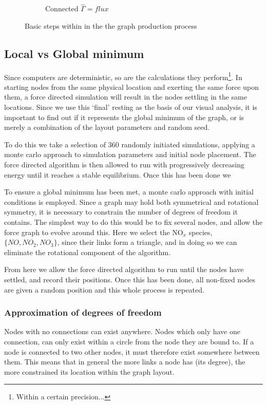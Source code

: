 \begin{figure}[H]
\begin{subfigure}[b]{.4\textwidth}
     \caption{Connected $\hat{\Gamma} = flux$}
     \end{subfigure}
        \caption{Basic steps within in the the graph production process}
      \label{fig:resmeth}
\end{figure}

\subsection{Local vs Global minimum }
Since computers are deterministic, so are the calculations they perform\footnote{Within a certain precision...}. In starting nodes from the same physical location and exerting the same force upon them, a force directed simulation will result in the nodes settling in the same locations. Since we use this `final' resting as the basis of our visual analysis, it is important to find out if it represents the global minimum of the graph, or is merely a combination of the layout parameters and random seed. 

To do this we take a selection of 360 randomly initiated simulations, applying a monte carlo approach to simulation parameters and initial node placement. The force directed algorithm is then allowed to run with progressively decreasing energy until it reaches a stable equilibrium. Once this has been done we 

To ensure a global minimum has been met, a monte carlo approach with initial conditions is employed. Since a graph may hold both symmetrical and rotational symmetry, it is necessary to constrain the number of degrees of freedom it contains. The simplest way to do this would be to fix several nodes, and allow the force graph to evolve around this. Here we select the NO$_x$ species,$\{NO, NO_2,NO_3\}$, since their links form a triangle, and in doing so we can eliminate the rotational component of the algorithm. 

From here we allow the force directed algorithm to run until the nodes have settled, and record their positions. Once this has been done, all non-fixed nodes are given a random position and this whole process is repeated. 


\subsubsection{Approximation of degrees of freedom} 
Nodes with no connections can exist anywhere. Nodes which only have one connection, can only exist within a circle from the node they are bound to. If a node is connected  to two other nodes, it must therefore exist somewhere between them. This means that in general the more links a node has (its degree), the more constrained its location within the graph layout. 



